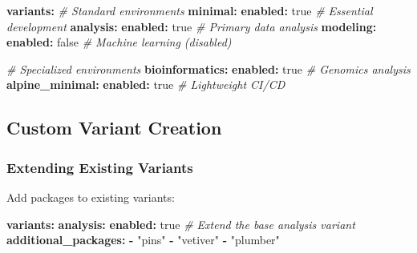\documentclass[
]{article}
\newenvironment{Shaded}{\begin{snugshade}}{\end{snugshade}}
\newcommand{\AttributeTok}[1]{\textcolor[rgb]{0.13,0.29,0.53}{#1}}
\newcommand{\CharTok}[1]{\textcolor[rgb]{0.31,0.60,0.02}{#1}}
\newcommand{\CommentTok}[1]{\textcolor[rgb]{0.56,0.35,0.01}{\textit{#1}}}
\newcommand{\FunctionTok}[1]{\textcolor[rgb]{0.13,0.29,0.53}{\textbf{#1}}}
\newcommand{\KeywordTok}[1]{\textcolor[rgb]{0.13,0.29,0.53}{\textbf{#1}}}
\newcommand{\StringTok}[1]{\textcolor[rgb]{0.31,0.60,0.02}{#1}}
\begin{document}
\begin{Shaded}
\begin{Highlighting}[]
\FunctionTok{variants}\KeywordTok{:}
\CommentTok{  \# Standard environments}
\AttributeTok{  }\FunctionTok{minimal}\KeywordTok{:}
\AttributeTok{    }\FunctionTok{enabled}\KeywordTok{:}\AttributeTok{ }\CharTok{true}\CommentTok{     \# Essential development}
\AttributeTok{  }\FunctionTok{analysis}\KeywordTok{:}
\AttributeTok{    }\FunctionTok{enabled}\KeywordTok{:}\AttributeTok{ }\CharTok{true}\CommentTok{     \# Primary data analysis}
\AttributeTok{  }\FunctionTok{modeling}\KeywordTok{:}
\AttributeTok{    }\FunctionTok{enabled}\KeywordTok{:}\AttributeTok{ }\CharTok{false}\CommentTok{    \# Machine learning (disabled)}

\CommentTok{  \# Specialized environments}
\AttributeTok{  }\FunctionTok{bioinformatics}\KeywordTok{:}
\AttributeTok{    }\FunctionTok{enabled}\KeywordTok{:}\AttributeTok{ }\CharTok{true}\CommentTok{     \# Genomics analysis}
\AttributeTok{  }\FunctionTok{alpine\_minimal}\KeywordTok{:}
\AttributeTok{    }\FunctionTok{enabled}\KeywordTok{:}\AttributeTok{ }\CharTok{true}\CommentTok{     \# Lightweight CI/CD}
\end{Highlighting}
\end{Shaded}

\subsection{Custom Variant Creation}\label{custom-variant-creation}

\subsubsection{Extending Existing
Variants}\label{extending-existing-variants}

Add packages to existing variants:

\begin{Shaded}
\begin{Highlighting}[]
\FunctionTok{variants}\KeywordTok{:}
\AttributeTok{  }\FunctionTok{analysis}\KeywordTok{:}
\AttributeTok{    }\FunctionTok{enabled}\KeywordTok{:}\AttributeTok{ }\CharTok{true}
\CommentTok{    \# Extend the base analysis variant}
\AttributeTok{    }\FunctionTok{additional\_packages}\KeywordTok{:}
\AttributeTok{      }\KeywordTok{{-}}\AttributeTok{ }\StringTok{"pins"}
\AttributeTok{      }\KeywordTok{{-}}\AttributeTok{ }\StringTok{"vetiver"}
\AttributeTok{      }\KeywordTok{{-}}\AttributeTok{ }\StringTok{"plumber"}
\end{Highlighting}
\end{Shaded}
\end{document}
